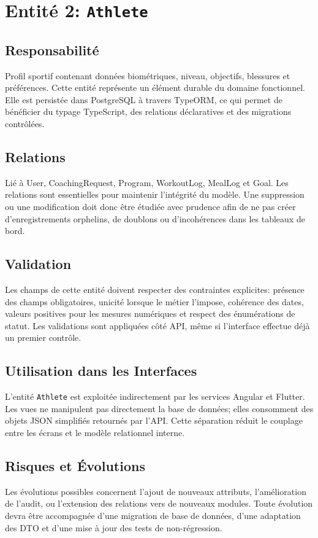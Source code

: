 \section{Entité 2: \texttt{Athlete}}
\subsection{Responsabilité}
Profil sportif contenant données biométriques, niveau, objectifs, blessures et préférences. Cette entité représente un élément durable du domaine fonctionnel. Elle est persistée dans PostgreSQL à travers TypeORM, ce qui permet de bénéficier du typage TypeScript, des relations déclaratives et des migrations contrôlées.

\subsection{Relations}
Lié à User, CoachingRequest, Program, WorkoutLog, MealLog et Goal. Les relations sont essentielles pour maintenir l'intégrité du modèle. Une suppression ou une modification doit donc être étudiée avec prudence afin de ne pas créer d'enregistrements orphelins, de doublons ou d'incohérences dans les tableaux de bord.

\subsection{Validation}
Les champs de cette entité doivent respecter des contraintes explicites: présence des champs obligatoires, unicité lorsque le métier l'impose, cohérence des dates, valeurs positives pour les mesures numériques et respect des énumérations de statut. Les validations sont appliquées côté API, même si l'interface effectue déjà un premier contrôle.

\subsection{Utilisation dans les Interfaces}
L'entité \texttt{Athlete} est exploitée indirectement par les services Angular et Flutter. Les vues ne manipulent pas directement la base de données; elles consomment des objets JSON simplifiés retournés par l'API. Cette séparation réduit le couplage entre les écrans et le modèle relationnel interne.

\subsection{Risques et Évolutions}
Les évolutions possibles concernent l'ajout de nouveaux attributs, l'amélioration de l'audit, ou l'extension des relations vers de nouveaux modules. Toute évolution devra être accompagnée d'une migration de base de données, d'une adaptation des DTO et d'une mise à jour des tests de non-régression.

